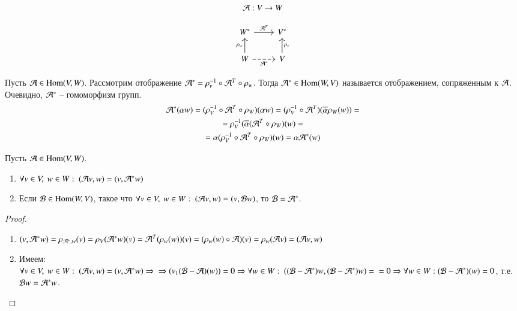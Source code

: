 \documentclass[main]{subfiles}
\begin{document}
\[ \mathcal{A}: V \rightarrow W\]

\[\begin{tikzcd}
        {W^*} & {V^*} \\
        W & V
        \arrow["{\mathcal{A}^T}", from=1-1, to=1-2]
        \arrow["{\rho_v}"', from=2-2, to=1-2]
        \arrow["{\rho_w}", from=2-1, to=1-1]
        \arrow["{\mathcal{A}^*}"', dashed, from=2-1, to=2-2]
    \end{tikzcd}\]

Пусть $\mathcal{A} \in \operatorname{Hom}(V, W)$. Рассмотрим отображение $\mathcal{A}^* = \rho_v^{-1} \circ \mathcal{A}^T \circ \rho_w$. Тогда $\mathcal{A}^* \in \operatorname{Hom}(W, V)$ называется отображением, сопряженным к $\mathcal{A}$.
Очевидно, $\mathcal{A}^*$ -- гомоморфизм групп.
\begin{gather*}
    \mathcal{A}^*(\alpha w) = (\rho_V^{-1} \circ \mathcal{A}^T \circ \rho_W)(\alpha w) = (\rho_V^{-1} \circ \mathcal{A}^T)(\overline{\alpha} \rho_W(w)) = \\
    = \rho_V^{-1} (\overline{\alpha} ( \mathcal{A}^T \circ \rho_W)(w) = \\
    = \alpha (\rho_V^{-1} \circ \mathcal{A}^T \circ \rho_W) (w) = \alpha \mathcal{A}^* (w)
\end{gather*}

\begin{proposition} 
    Пусть $\mathcal{A} \in \operatorname{Hom}(V, W)$.

    \begin{enumerate}
        \item $\forall v \in V, \ w \in W: \ (\mathcal{A} v, w) = (v, \mathcal{A}^* w)$
        \item Если $\mathcal{B} \in \operatorname{Hom} (W, V)$, такое что $\forall v \in V, \ w \in W: \ (\mathcal{A} v, w) = (v, \mathcal{B} w)$,  то $\mathcal{B} = \mathcal{A}^*$.
    \end{enumerate}
\end{proposition}

\begin{proof}
    \begin{enumerate}
        \item $(v, \mathcal{A}^* w) = \rho_{\mathcal{A}^*, w} (v) = \rho_V (\mathcal{A}^*w)(v) = \mathcal{A}^T(\rho_w(w))(v) = (\rho_w(w) \circ \mathcal{A})(v) = \rho_w (\mathcal{A} v) = (\mathcal{A} v, w)$
        \item Имеем: $\forall v \in V, \ w \in W: \ (\mca v, w) = (v, \mca^* w) \Rightarrow \\ \Rightarrow (v_1 (\mcb - \mca)(w)) = 0 \Rightarrow \forall w \in W: \ ((\mcb - \mca^*)w, (\mcb - \mca^*)w) = \\ = 0 \Rightarrow \forall w \in W: (\mcb - \mca^*)(w) = 0$, т.е. $\mathcal{B} w = \mathcal{A}^* w$.
    \end{enumerate}
\end{proof}
\end{document}
